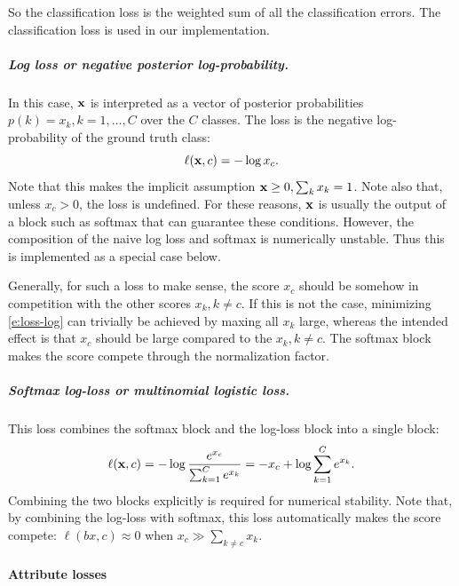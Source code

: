 So the classification loss is the weighted sum of all the classification errors. 
The classification loss is used in our implementation.


\subparagraph{Log loss or negative posterior log-probability.} In this case, $\mathbf{x}$ is interpreted as a vector of posterior probabilities $p(k) = x_k, k=1,\dots, C$ over the $C$ classes. The loss is the negative log-probability of the ground truth class:
\begin{equation}\label{e:loss-log}
\ell(\mathbf{x}, c) = - \log x_c.
\end{equation}
Note that this makes the implicit assumption $\mathbf{x} \geq 0, \sum_k x_k = 1$. Note also that, unless $x_c > 0$, the loss is undefined. For these reasons, $\mathbf{x}$ is usually the output of a block such as softmax that can guarantee these conditions. However, the composition of the naive log loss and softmax is numerically unstable. Thus this is implemented as a special case below.

Generally, for such a loss to make sense, the score $x_c$ should be somehow in competition with the other scores $x_k, k\not = c$. If this is not the case, minimizing \eqref{e:loss-log} can trivially be achieved by maxing all $x_k$ large, whereas the intended effect is that $x_c$ should be large compared to the $x_k, k\not=c$. The softmax block makes the score compete through the normalization factor.

\subparagraph{Softmax log-loss or multinomial logistic loss.} This loss combines the softmax block and the log-loss block into a single block:
\begin{equation}\label{e:loss-softmaxlog}
\ell(\mathbf{x}, c) = - \log \frac{e^{x_c}}{\sum_{k=1}^C e^{x_k}}
= - x_c + \log \sum_{k=1}^C e^{x_k}.
\end{equation}
Combining the two blocks explicitly is required for numerical stability. Note that, by combining the log-loss with softmax, this loss automatically makes the score compete: $\ell(bx,c) \approx 0$ when $x_c \gg \sum_{k\not= c} x_k$.

\paragraph{Attribute losses}\label{s:loss-attributes}

